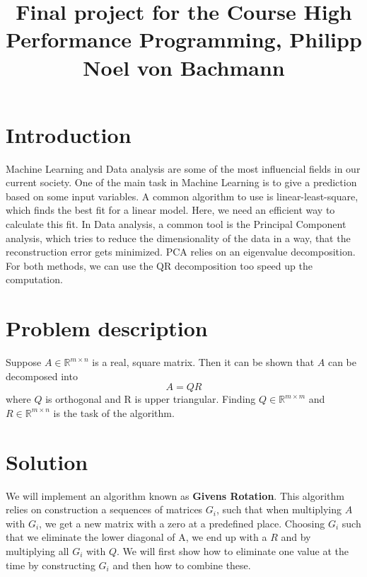 \documentclass[a4paper]{scrartcl}
\title{Final project for the Course High Performance Programming, Philipp Noel von Bachmann}
\begin{document}
\maketitle
\section{Introduction}
    Machine Learning and Data analysis are some of the most influencial fields
    in our current society. One of the main task in Machine Learning is to give
    a prediction based on some input variables. A common algorithm to use is
    linear-least-square, which finds the best fit for a linear model. Here, we
    need an efficient way to calculate this fit. In Data analysis, a common tool
    is the Principal Component analysis, which tries to reduce the
    dimensionality of the data in a way, that the reconstruction error gets
    minimized. PCA relies on an eigenvalue decomposition. For both methods, we
    can use the QR decomposition too speed up the computation.


\section{Problem description}
    Suppose $A \in \mathbb{R}^{m\times n}$ is a real, square matrix. Then it can be shown that $A$ can be
    decomposed into 
    \begin{equation}\label{eq:QR}
        A = QR
    \end{equation}
    where $Q$ is orthogonal and R is upper triangular. Finding $Q \in \mathbb{R}^{m\times m}$ and $R \in \mathbb{R}^{m\times n}$ is
    the task of the algorithm.

\section{Solution}
    We will implement an algorithm known as \textbf{Givens Rotation}. This
    algorithm relies on construction a sequences of matrices $G_i$, such that
    when multiplying $A$ with $G_i$, we get a new matrix with a zero at a
    predefined place. Choosing $G_i$ such that we eliminate the lower diagonal
    of A, we end up with a $R$ and by multiplying all $G_i$ with $Q$. We will
    first show how to eliminate one value at the time by constructing $G_i$ and
    then how to combine these.
\end{document}
